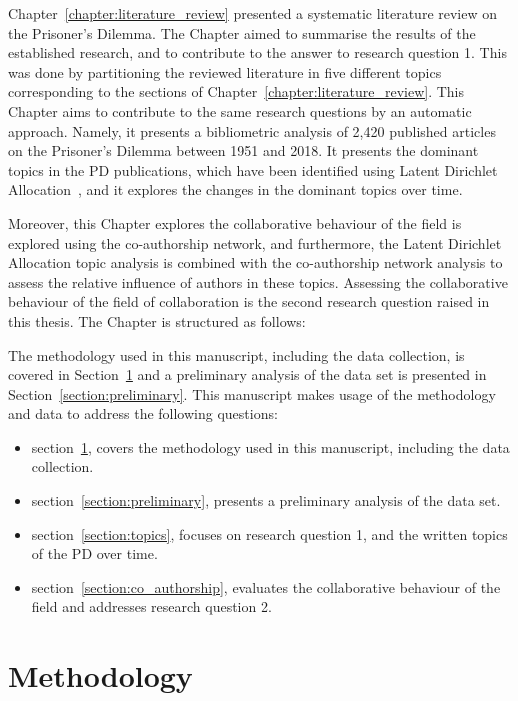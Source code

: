 Chapter~\ref{chapter:literature_review} presented a systematic literature review
on the Prisoner's Dilemma. The Chapter aimed to summarise the results of the
established research, and to contribute to the answer to research question 1.
This was done by partitioning the reviewed literature in five different topics
corresponding to the sections of Chapter~\ref{chapter:literature_review}. This
Chapter aims to contribute to the same research questions by an automatic
approach. Namely, it presents a bibliometric analysis of 2,420 published
articles on the Prisoner's Dilemma between 1951 and 2018. It presents the
dominant topics in the PD publications, which have been identified using Latent
Dirichlet Allocation~\cite{Blei2003}, and it explores the changes in the
dominant topics over time.

Moreover, this Chapter explores the collaborative behaviour of the field is explored
using the co-authorship network, and furthermore, the Latent Dirichlet
Allocation topic analysis is combined with the co-authorship network analysis to assess
the relative influence of authors in these topics. Assessing the collaborative
behaviour of the field of collaboration is the second research question raised
in this thesis. The Chapter is structured as follows:

The methodology used in this manuscript, including the data collection, is
covered in Section~\ref{section:methodology} and a preliminary analysis of the
data set is presented in Section~\ref{section:preliminary}. This manuscript
makes usage of the methodology and data to address the following questions:

\begin{itemize}
    \item section~\ref{section:methodology}, covers the methodology used in this manuscript,
    including the data collection.
    \item section~\ref{section:preliminary}, presents a preliminary analysis of the
    data set.
    \item section~\ref{section:topics}, focuses on research question 1, and the
    written topics of the PD over time.
    \item section~\ref{section:co_authorship}, evaluates the collaborative behaviour
    of the field and addresses research question 2.
\end{itemize}

\section{Methodology}\label{section:methodology}

